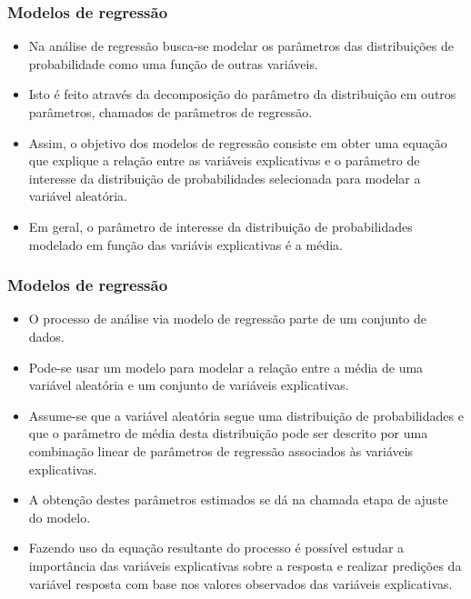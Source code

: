 \documentclass[10pt,
  aspectratio=169,
  serif,
  mathserif,
  professionalfont,
  compress,
  handout,
  ]{beamer}\usepackage[]{graphicx}\usepackage[]{color}
\begin{document}

\begin{frame}
  \frametitle{Modelos de regressão}

  \begin{itemize}
    \itemsep 2ex

  \item Na análise de regressão busca-se modelar os parâmetros das distribuições de probabilidade como uma função de outras variáveis.
  
  \item Isto é feito através da decomposição do parâmetro da distribuição em outros parâmetros, chamados de parâmetros de regressão. 
  
  \item Assim, o objetivo dos modelos de regressão consiste em obter uma equação que explique a relação entre as variáveis explicativas e o parâmetro de interesse da distribuição de probabilidades selecionada para modelar a variável aleatória. 
  
  \item Em geral, o parâmetro de interesse da distribuição de probabilidades modelado em função das variávis explicativas é a média. 
  
  \end{itemize}
\end{frame}


\begin{frame}
  \frametitle{Modelos de regressão}

  \begin{itemize}
    \itemsep 2ex

  \item O processo de análise via modelo de regressão parte de um conjunto de dados.
  
  \item Pode-se usar um modelo para modelar a relação entre a média de uma variável aleatória e um conjunto de variáveis explicativas. 
  
  \item Assume-se que a variável aleatória segue uma distribuição de probabilidades e que o parâmetro de média desta distribuição pode ser descrito por uma combinação linear de parâmetros de regressão associados às variáveis explicativas. 
  
  \item A obtenção destes parâmetros estimados se dá na chamada etapa de ajuste do modelo.
  
  \item Fazendo uso da equação resultante do processo é possível estudar a importância das variáveis explicativas sobre a resposta e realizar predições da variável resposta com base nos valores observados das variáveis explicativas. 
  
  \end{itemize}
\end{frame}
\end{document}
